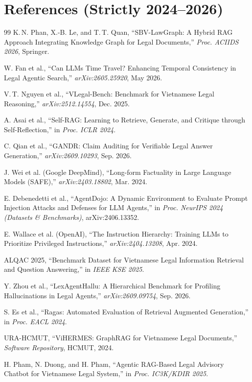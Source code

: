 \documentclass[10pt,a4paper]{article}
\begin{document}
\section{References (Strictly 2024--2026)}

\begingroup
\fontsize{8pt}{10pt}\selectfont
\setlength{\parskip}{1.5pt}
\begin{thebibliography}{99}
 K.\,N. Phan, X.-B. Le, and T.\,T. Quan, ``SBV-LawGraph: A Hybrid RAG Approach Integrating Knowledge Graph for Legal Documents,'' \textit{Proc. ACIIDS 2026}, Springer.

 W. Fan et al., ``Can LLMs Time Travel? Enhancing Temporal Consistency in Legal Agentic Search,'' \textit{arXiv:2605.25920}, May 2026.

 V.\,T. Nguyen et al., ``VLegal-Bench: Benchmark for Vietnamese Legal Reasoning,'' \textit{arXiv:2512.14554}, Dec. 2025.

 A. Asai et al., ``Self-RAG: Learning to Retrieve, Generate, and Critique through Self-Reflection,'' in \textit{Proc. ICLR 2024}.

 C. Qian et al., ``GANDR: Claim Auditing for Verifiable Legal Answer Generation,'' \textit{arXiv:2609.10293}, Sep. 2026.

 J. Wei et al. (Google DeepMind), ``Long-form Factuality in Large Language Models (SAFE),'' \textit{arXiv:2403.18802}, Mar. 2024.

 E. Debenedetti et al., ``AgentDojo: A Dynamic Environment to Evaluate Prompt Injection Attacks and Defenses for LLM Agents,'' in \textit{Proc. NeurIPS 2024 (Datasets \& Benchmarks)}, arXiv:2406.13352.

 E. Wallace et al. (OpenAI), ``The Instruction Hierarchy: Training LLMs to Prioritize Privileged Instructions,'' \textit{arXiv:2404.13208}, Apr. 2024.

 ALQAC 2025, ``Benchmark Dataset for Vietnamese Legal Information Retrieval and Question Answering,'' in \textit{IEEE KSE 2025}.

 Y. Zhou et al., ``LexAgentHallu: A Hierarchical Benchmark for Profiling Hallucinations in Legal Agents,'' \textit{arXiv:2609.09754}, Sep. 2026.

 S. Es et al., ``Ragas: Automated Evaluation of Retrieval Augmented Generation,'' in \textit{Proc. EACL 2024}.

 URA-HCMUT, ``ViHERMES: GraphRAG for Vietnamese Legal Documents,'' \textit{Software Repository}, HCMUT, 2024.

 H. Pham, N. Duong, and H. Pham, ``Agentic RAG-Based Legal Advisory Chatbot for Vietnamese Legal System,'' in \textit{Proc. IC3K/KDIR 2025}.
\end{thebibliography}
\endgroup
\end{document}
